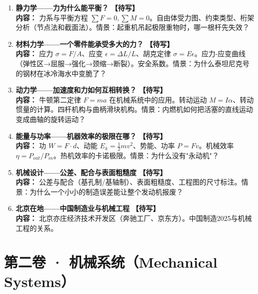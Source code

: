 \documentclass[a4paper,11pt]{ctexart}
\newcommand{\draft}{\textcolor{orange!80!black}{\textbf{【待写】}}}
\begin{document}
\begin{enumerate}
\item[\textbf{第1课}] \textbf{静力学——力为什么能平衡？} \draft \\
\textbf{内容：} 力系与平衡方程 $\sum F=0, \sum M=0$。自由体受力图、约束类型、桁架分析（节点法和截面法）。情景：起重机吊起极限重物时，哪一根杆先失效？
\item[\textbf{第2课}] \textbf{材料力学——一个零件能承受多大的力？} \draft \\
\textbf{内容：} 应力 $\sigma = F/A$、应变 $\epsilon = \Delta L/L$、胡克定律 $\sigma = E\epsilon$。应力-应变曲线（弹性区→屈服→强化→颈缩→断裂）。安全系数。情景：为什么泰坦尼克号的钢材在冰冷海水中变脆了？
\item[\textbf{第3课}] \textbf{动力学——加速度和力如何互相转换？} \draft \\
\textbf{内容：} 牛顿第二定律 $F=ma$ 在机械系统中的应用。转动运动 $M=I\alpha$、转动惯量的计算。四杆机构与曲柄滑块机构。情景：内燃机如何把活塞的直线运动变成曲轴的旋转运动？
\item[\textbf{第4课}] \textbf{能量与功率——机器效率的极限在哪？} \draft \\
\textbf{内容：} 功 $W=F\cdot d$、动能 $E_k=\frac12mv^2$、势能、功率 $P=Fv$。机械效率 $\eta = P_{out}/P_{in}$。热机效率的卡诺极限。情景：为什么没有"永动机"？
\item[\textbf{第5课}] \textbf{机械设计——公差、配合与表面粗糙度} \draft \\
\textbf{内容：} 公差与配合（基孔制/基轴制）、表面粗糙度、工程图的尺寸标注。情景：为什么一个小小的制造误差能让整个发动机报废？
\item[\textbf{第6课}] \textbf{北京在地——中国制造业与机械工程} \draft \\
\textbf{内容：} 北京亦庄经济技术开发区（奔驰工厂、京东方）。中国制造2025与机械工程的关系。
\end{enumerate}

\section*{第二卷 · 机械系统（Mechanical Systems）}
\end{document}

